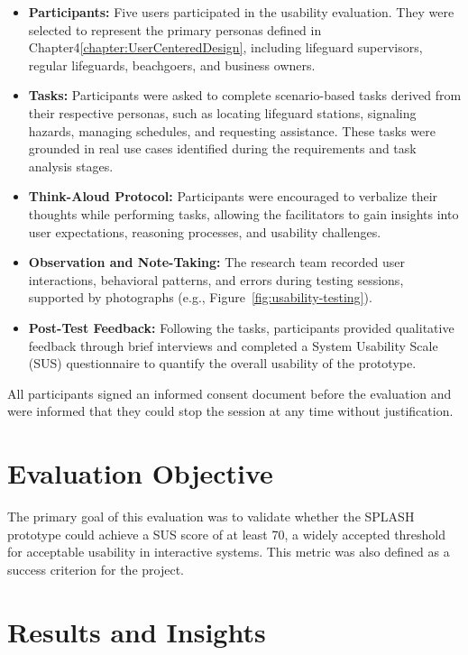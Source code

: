 \begin{itemize}
    \item \textbf{Participants:} Five users participated in the usability evaluation. They were selected to represent the primary personas defined in Chapter4\ref{chapter:UserCenteredDesign}, including lifeguard supervisors, regular lifeguards, beachgoers, and business owners.
    
    \item \textbf{Tasks:} Participants were asked to complete scenario-based tasks derived from their respective personas, such as locating lifeguard stations, signaling hazards, managing schedules, and requesting assistance. These tasks were grounded in real use cases identified during the requirements and task analysis stages.

    \item \textbf{Think-Aloud Protocol:} Participants were encouraged to verbalize their thoughts while performing tasks, allowing the facilitators to gain insights into user expectations, reasoning processes, and usability challenges.

    \item \textbf{Observation and Note-Taking:} The research team recorded user interactions, behavioral patterns, and errors during testing sessions, supported by photographs (e.g., Figure~\ref{fig:usability-testing}).

    \item \textbf{Post-Test Feedback:} Following the tasks, participants provided qualitative feedback through brief interviews and completed a System Usability Scale (SUS) questionnaire to quantify the overall usability of the prototype.
\end{itemize}

All participants signed an informed consent document before the evaluation and were informed that they could stop the session at any time without justification.

\section{Evaluation Objective}
The primary goal of this evaluation was to validate whether the SPLASH prototype could achieve a SUS score of at least 70, a widely accepted threshold for acceptable usability in interactive systems. This metric was also defined as a success criterion for the project.

\section{Results and Insights}

